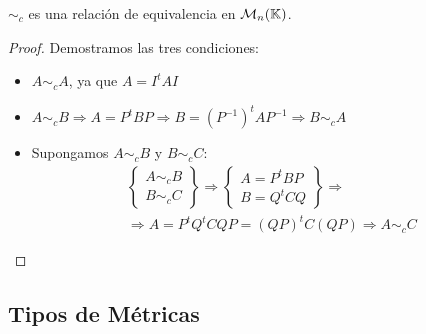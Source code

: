 \begin{prop}
    $\sim_c$ es una relación de equivalencia en $\mathcal{M}_n(\mathbb{K})$.
\end{prop}
\begin{proof} Demostramos las tres condiciones:
\begin{itemize}
    \item $A\sim_c A$, ya que $A=I^t AI$
    
    \item $A\sim_c B \Longrightarrow A=P^tBP \Longrightarrow B=(P^{-1})^tAP^{-1} \Longrightarrow B\sim_c A$

    \item Supongamos $A\sim_c B$ y $B\sim_c C$:
    \begin{multline*}
        \left\{\begin{array}{c}
            A\sim_c B  \\
            B\sim_c C 
        \end{array} \right\}
        \Longrightarrow
        \left\{\begin{array}{c}
            A = P^tBP  \\
            B = Q^tCQ 
        \end{array} \right\}
        \Longrightarrow\\ \Longrightarrow
        A = P^tQ^tCQP = (QP)^tC(QP)
        \Longrightarrow
        A\sim_c C
    \end{multline*}
\end{itemize}
\end{proof}

\subsection{Tipos de Métricas}

